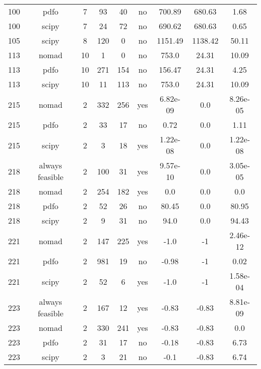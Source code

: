 \begin{scriptsize}
\begin{center}
\begin{longtable}{ccccccccc}
100 &            pdfo &  7 &     93 &     40 &      no &      700.89 &      680.63 &     1.68\\
100 &           scipy &  7 &     24 &     72 &      no &      690.62 &      680.63 &     0.65\\
105 &           scipy &  8 &    120 &      0 &      no &     1151.49 &     1138.42 &    50.11\\
113 &           nomad & 10 &      1 &      0 &      no &       753.0 &       24.31 &    10.09\\
113 &            pdfo & 10 &    271 &    154 &      no &      156.47 &       24.31 &     4.25\\
113 &           scipy & 10 &     11 &    113 &      no &       753.0 &       24.31 &    10.09\\
215 &           nomad &  2 &    332 &    256 &     yes &    6.82e-09 &         0.0 & 8.26e-05\\
215 &            pdfo &  2 &     33 &     17 &      no &        0.72 &         0.0 &     1.11\\
215 &           scipy &  2 &      3 &     18 &     yes &    1.22e-08 &         0.0 & 1.22e-08\\
218 & always feasible &  2 &    100 &     31 &     yes &    9.57e-10 &         0.0 & 3.05e-05\\
218 &           nomad &  2 &    254 &    182 &     yes &         0.0 &         0.0 &      0.0\\
218 &            pdfo &  2 &     52 &     26 &      no &       80.45 &         0.0 &    80.95\\
218 &           scipy &  2 &      9 &     31 &      no &        94.0 &         0.0 &    94.43\\
221 &           nomad &  2 &    147 &    225 &     yes &        -1.0 &          -1 & 2.46e-12\\
221 &            pdfo &  2 &    981 &     19 &      no &       -0.98 &          -1 &     0.02\\
221 &           scipy &  2 &     52 &      6 &     yes &        -1.0 &          -1 & 1.58e-04\\
223 & always feasible &  2 &    167 &     12 &     yes &       -0.83 &       -0.83 & 8.81e-09\\
223 &           nomad &  2 &    330 &    241 &     yes &       -0.83 &       -0.83 &      0.0\\
223 &            pdfo &  2 &     31 &     17 &      no &       -0.18 &       -0.83 &     6.73\\
223 &           scipy &  2 &      3 &     21 &      no &        -0.1 &       -0.83 &     6.74\\

\end{longtable}
\end{center}
\end{scriptsize}

